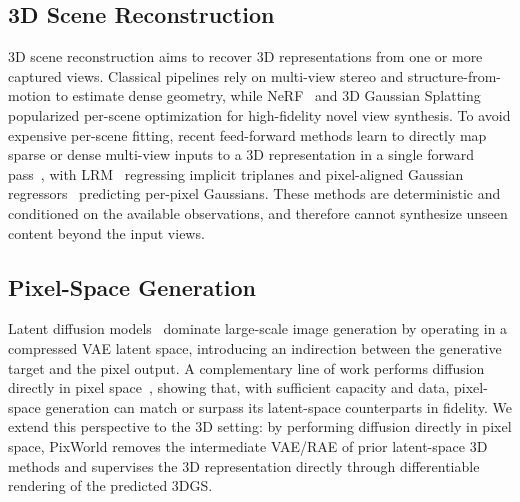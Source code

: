 \subsection{3D Scene Reconstruction}
3D scene reconstruction aims to recover 3D representations from one or more captured views. Classical pipelines rely on multi-view stereo and structure-from-motion to estimate dense geometry, while NeRF~\citep{mildenhall2021nerf} and 3D Gaussian Splatting~\citep{kerbl20233d} popularized per-scene optimization for high-fidelity novel view synthesis. To avoid expensive per-scene fitting, recent feed-forward methods learn to directly map sparse or dense multi-view inputs to a 3D representation in a single forward pass~\citep{hong2023lrm,charatan2024pixelsplat,szymanowicz2024splatter,chen2024mvsplat,xu2025depthsplat}, with LRM~\citep{hong2023lrm} regressing implicit triplanes and pixel-aligned Gaussian regressors~\citep{charatan2024pixelsplat,szymanowicz2024splatter,chen2024mvsplat} predicting per-pixel Gaussians. These methods are deterministic and conditioned on the available observations, and therefore cannot synthesize unseen content beyond the input views.


\subsection{Pixel-Space Generation}
Latent diffusion models~\citep{rombach2022high,podell2023sdxl,peebles2023scalable} dominate large-scale image generation by operating in a compressed VAE latent space, introducing an indirection between the generative target and the pixel output. A complementary line of work performs diffusion directly in pixel space~\citep{dhariwal2021diffusion,jabri2023scalable,hoogeboom2023simple,hoogeboom2025simpler,wang2025pixnerd,chen2025pixelflow,yu2025pixeldit,ma2025deco,chen2025dip,li2025back}, showing that, with sufficient capacity and data, pixel-space generation can match or surpass its latent-space counterparts in fidelity. We extend this perspective to the 3D setting: by performing diffusion directly in pixel space, PixWorld removes the intermediate VAE/RAE of prior latent-space 3D methods and supervises the 3D representation directly through differentiable rendering of the predicted 3DGS.
